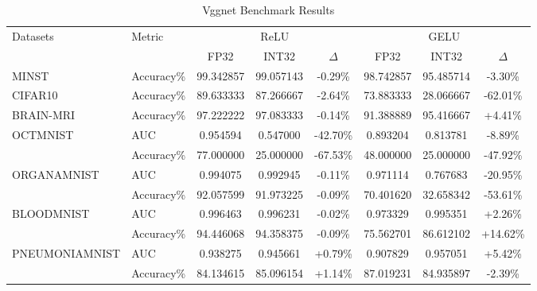 \documentclass{article}
\begin{document}
\begin{table}[ht]
\centering
\caption{Vggnet Benchmark Results}
\begin{tabular}{|l|l|c|c|c|c|c|c|}
\hline
\multirow{2}{*}{Datasets} & \multirow{2}{*}{Metric} & \multicolumn{3}{c|}{ReLU} & \multicolumn{3}{c|}{GELU} \\
\cline{3-8}
& & FP32 & INT32 & $\Delta$ & FP32 & INT32 & $\Delta$ \\
\hline
MINST & Accuracy\% & 99.342857 & 99.057143 & -0.29\% & 98.742857 & 95.485714 & -3.30\% \\
\hline
CIFAR10 & Accuracy\% & 89.633333 & 87.266667 & -2.64\% & 73.883333 & 28.066667 & -62.01\% \\
\hline
BRAIN-MRI & Accuracy\% & 97.222222 & 97.083333 & -0.14\% & 91.388889 & 95.416667 & +4.41\% \\
\hline
OCTMNIST & AUC & 0.954594 & 0.547000 & -42.70\% & 0.893204 & 0.813781 & -8.89\% \\
 & Accuracy\% & 77.000000 & 25.000000 & -67.53\% & 48.000000 & 25.000000 & -47.92\% \\
\hline
ORGANAMNIST & AUC & 0.994075 & 0.992945 & -0.11\% & 0.971114 & 0.767683 & -20.95\% \\
 & Accuracy\% & 92.057599 & 91.973225 & -0.09\% & 70.401620 & 32.658342 & -53.61\% \\
\hline
BLOODMNIST & AUC & 0.996463 & 0.996231 & -0.02\% & 0.973329 & 0.995351 & +2.26\% \\
 & Accuracy\% & 94.446068 & 94.358375 & -0.09\% & 75.562701 & 86.612102 & +14.62\% \\
\hline
PNEUMONIAMNIST & AUC & 0.938275 & 0.945661 & +0.79\% & 0.907829 & 0.957051 & +5.42\% \\
 & Accuracy\% & 84.134615 & 85.096154 & +1.14\% & 87.019231 & 84.935897 & -2.39\% \\
\hline
\end{tabular}
\end{table}
\end{document}
